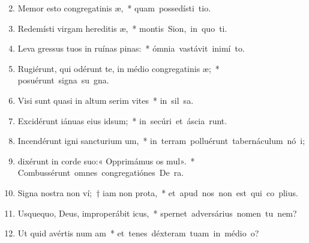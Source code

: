 \begin{flushleft}
\begin{enumerate}[leftmargin=*]
\setcounter{enumi}{1}

\item Memor esto congregatinis æ,~* \mbox{quam possedísti  tio.}

\item Redemísti virgam hereditis æ,~* \mbox{montis Sion, in quo ti.}

\item Leva gressus tuos in ruínas pinas:~* \mbox{ómnia vastávit inimí  to.}

\item Rugiérunt, qui odérunt te, in médio congregatinis æ;~* \mbox{posuérunt signa su  gna.}

\item Visi sunt quasi in altum serim vites~* \mbox{in sil sa.}

\item Excidérunt iánuas eius  idsum;~* \mbox{in secúri et áscia runt.}

\item Incendérunt igni sancturium um,~* \mbox{in terram polluérunt tabernáculum nó i;}

\item dixérunt in corde suo:« Opprimámus os mul».~* \mbox{Combussérunt omnes congregatiónes De  ra.}

\item Signa nostra non ví;~† iam non  prota,~* \mbox{et apud nos non est qui co plius.}

\item Usquequo, Deus, improperábit icus,~* \mbox{spernet adversárius nomen tu  nem?}

\item Ut quid avértis num am~* \mbox{et tenes déxteram tuam in médio  o?}


\end{enumerate}
\end{flushleft}
